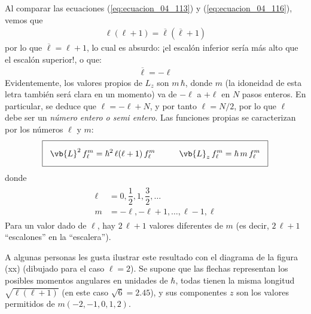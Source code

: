 Al comparar las ecuaciones (\ref{eq:ecuacion_04_113}) y (\ref{eq:ecuacion_04_116}), vemos que
\begin{align*}
\ell (\ell + 1) = \overline{\ell} (\overline{\ell} + 1)
\end{align*}
por lo que $\overline{\ell} = \ell + 1$, lo cual es absurdo: ¡el escalón inferior sería más alto que el escalón superior!, o que:
\begin{align}
\overline{\ell} = - \ell
\label{eq:ecuacion_04_117}
\end{align}
Evidentemente, los valores propios de $L_{z}$ son $m \, \hbar$, donde $m$ (la idoneidad de esta letra también será clara en un momento) va de $-\ell$ a $+\ell$ en $N$ pasos enteros. En particular, se deduce que $\ell = -\ell + N$, y por tanto $\ell = N/2$, por lo que $\ell$ debe ser un \emph{número entero o semi entero}. Las funciones propias se caracterizan por los números $\ell$ y $m$:
\begin{align}
\setlength{\fboxsep}{3\fboxsep}\boxed{
\vb{L}^{2} \, f_{\ell}^{m} = \hbar^{2} \, \ell (\ell + 1) \, f_{\ell}^{m} \hspace{1cm} \vb{L}_{z} \, f_{\ell}^{m} = \hbar \, m \, f_{\ell}^{m}
}
\label{eq:ecuacion_04_118}
\end{align}
donde
\begin{align}
\begin{aligned}
\ell &= 0, \dfrac{1}{2}, 1, \dfrac{3}{2}, \ldots \\[0.5em]
m &= -\ell, -\ell + 1, \ldots, \ell -1, \ell
\end{aligned}
\label{eq:ecuacion_04_199}
\end{align}
Para un valor dado de $\ell$, hay $2 \, \ell + 1$ valores diferentes de $m$ (es decir, $2 \, \ell + 1$ \enquote{escalones} en la \enquote{escalera}).
\par
A algunas personas les gusta ilustrar este resultado con el diagrama de la figura (xx) (dibujado para el caso $\ell = 2$). Se supone que las flechas representan los posibles momentos angulares en unidades de $\hbar$, todas tienen la misma longitud $\sqrt{\ell (\ell + 1)}$ (en este caso $\sqrt{6}= 2.45$), y sus componentes $z$ son los valores permitidos de $m  (-2, -1, 0, 1, 2)$. 
